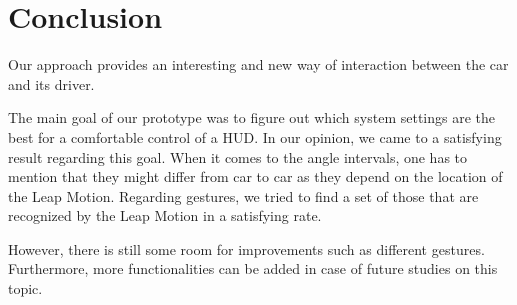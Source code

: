 \documentclass{sigchi-ext}
\begin{document}
\section{Conclusion}
Our approach provides an interesting and new way of interaction between the car and its driver. 

The main goal of our prototype was to figure out which system settings are the best for a comfortable control of a HUD. In our opinion, we came to a satisfying result regarding this goal. When it comes to the angle intervals, one has to mention that they might differ from car to car as they depend on the location of the Leap Motion. Regarding gestures, we tried to find a set of those that are recognized by the Leap Motion in a satisfying rate.

However, there is still some room for improvements such as different gestures. Furthermore, more functionalities can be added in case of future studies on this topic.



\end{document}
